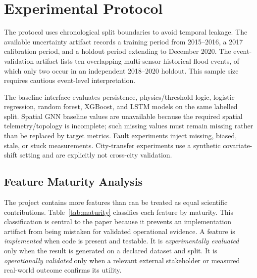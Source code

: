 \documentclass[journal]{IEEEtran}
\begin{document}
\section{Experimental Protocol}
The protocol uses chronological split boundaries to avoid temporal leakage. The available uncertainty artifact records a training period from 2015--2016, a 2017 calibration period, and a holdout period extending to December 2020. The event-validation artifact lists ten overlapping multi-sensor historical flood events, of which only two occur in an independent 2018--2020 holdout. This sample size requires cautious event-level interpretation.

The baseline interface evaluates persistence, physics/threshold logic, logistic regression, random forest, XGBoost, and LSTM models on the same labelled split. Spatial GNN baseline values are unavailable because the required spatial telemetry/topology is incomplete; such missing values must remain missing rather than be replaced by target metrics. Fault experiments inject missing, biased, stale, or stuck measurements. City-transfer experiments use a synthetic covariate-shift setting and are explicitly not cross-city validation.

\subsection{Feature Maturity Analysis}
The project contains more features than can be treated as equal scientific contributions. Table~\ref{tab:maturity} classifies each feature by maturity. This classification is central to the paper because it prevents an implementation artifact from being mistaken for validated operational evidence. A feature is \emph{implemented} when code is present and testable. It is \emph{experimentally evaluated} only when the result is generated on a declared dataset and split. It is \emph{operationally validated} only when a relevant external stakeholder or measured real-world outcome confirms its utility.
\end{document}
